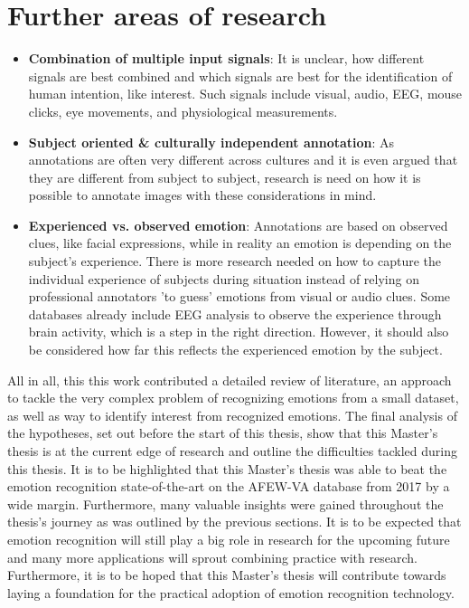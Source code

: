\section{Further areas of research}
\begin{itemize}
    \item \textbf{Combination of multiple input signals}: It is unclear, how different signals are best combined and which signals are best for the identification of human intention, like interest. Such signals include visual, audio, EEG, mouse clicks, eye movements, and physiological measurements.
    \item \textbf{Subject oriented \& culturally independent annotation}: As annotations are often very different across cultures and it is even argued that they are different from subject to subject, research is need on how it is possible to annotate images with these considerations in mind. 
    \item \textbf{Experienced vs. observed emotion}: Annotations are based on observed clues, like facial expressions, while in reality an emotion is depending on the subject's experience. There is more research needed on how to capture the individual experience of subjects during situation instead of relying on professional annotators 'to guess' emotions from visual or audio clues. Some databases already include EEG analysis to observe the experience through brain activity, which is a step in the right direction. However, it should also be considered how far this reflects the experienced emotion by the subject.
\end{itemize}

All in all, this this work contributed a detailed review of literature, an approach to tackle the very complex problem of recognizing emotions from a small dataset, as well as way to identify interest from recognized emotions. The final analysis of the hypotheses, set out before the start of this thesis, show that this Master's thesis is at the current edge of research and outline the difficulties tackled during this thesis. It is to be highlighted that this Master's thesis was able to beat the emotion recognition state-of-the-art on the AFEW-VA database from 2017 by a wide margin. Furthermore, many valuable insights were gained throughout the thesis's journey as was outlined by the previous sections. 
\newline\newline
It is to be expected that emotion recognition will still play a big role in research for the upcoming future and many more applications will sprout combining practice with research. Furthermore, it is to be hoped that this Master's thesis will contribute towards laying a foundation for the practical adoption of emotion recognition technology.

